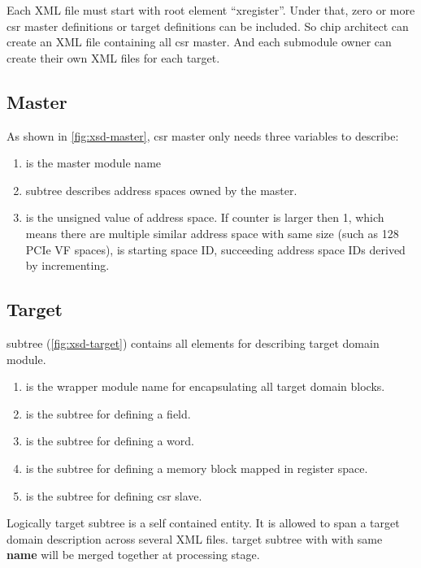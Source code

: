 \documentclass[10pt,oneside]{book}
\begin{document}
Each XML file must start with root element ``xregister''.  Under that, zero 
or more \gls{csr master} definitions or \gls{target} definitions can be 
included. So chip architect can create an XML file containing all \gls{csr master}. 
And each submodule owner can create their own XML files for each \gls{target}. 

\subsection{Master}
As shown in \autoref{fig:xsd-master}, \gls{csr master} only needs three variables
to describe:
\begin{enumerate} 
\item {} is the master module name
\item {} subtree describes address spaces owned by the master. 
\item {} is the unsigned value of address space. 
  If counter is larger then 1, which means there are multiple similar address space with 
  same size (such as 128 PCIe VF spaces),  is starting space ID, 
  succeeding address space IDs derived by incrementing.  
\end{enumerate}


\subsection{Target}
 subtree (\autoref{fig:xsd-target}) 
contains all elements for describing target domain module. 
\begin{enumerate}
\item {} is the wrapper module name for encapsulating all target 
  domain blocks. 
\item {} is the subtree for defining a \gls{field}.
\item {}  is the subtree for defining a \gls{word}.
\item {} is the subtree for defining a memory block mapped in 
  register space. 
\item {} is the subtree for defining \gls{csr slave}. 
\end{enumerate}
Logically target subtree is a self contained entity. It is allowed to span
a target domain description across several XML files. target subtree with 
with same \textbf{name} will be merged together at processing stage. 
\end{document}
